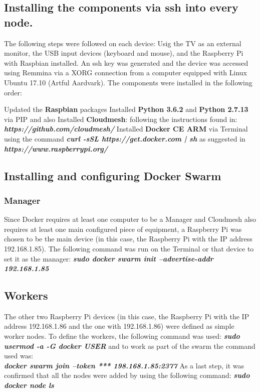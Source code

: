 \documentclass[sigconf]{acmart}
\begin{document}
	\subsection{Installing the components via ssh into every node.}
	
	The following steps were followed on each device:
	Usig the TV as an external monitor, the USB input devices (keyboard and mouse), and the Raspberry Pi with Raspbian installed. An ssh key was generated and the device was accessed using Remmina via a XORG connection from a computer equipped with Linux Ubuntu 17.10 (Artful Aardvark).
	The components were installed in the following order:
	
	Updated the \textbf{Raspbian} packages \textbf{\textit{}}
	Installed \textbf{Python 3.6.2} and \textbf{Python 2.7.13} via PIP and also 
	Installed \textbf{Cloudmesh}: following the instructions found in: \textbf{\textit{https://github.com/cloudmesh/}}
	Installed \textbf{Docker CE ARM} via Terminal using the command \textbf{\textit{curl -sSL https://get.docker.com | sh}}
	as suggested in\\ \textbf{\textit{https://www.raspberrypi.org/}}

	
	\subsection{Installing and configuring Docker Swarm}
	\subsubsection{Manager}
	Since Docker requires at least one computer to be a Manager and Cloudmesh also requires at least one main configured piece of equipment, a Raspberry Pi was chosen to be the main device (in this case, the Raspberry Pi with the IP address 192.168.1.85). The following command was run on the Terminal or that device to set it as the manager: \textbf{\textit{sudo docker swarm init --advertise-addr 192.168.1.85}}
	\subsection{Workers}
	The other two Raspberry Pi devices (in this case, the Raspberry Pi with the IP address 192.168.1.86 and the one with 192.168.1.86) were defined as simple worker nodes.
	To define the workers, the following command was used: \textbf{\textit{sudo usermod -a -G docker USER}} and to work as part of the swarm the command used was:\\
	 \textbf{\textit{docker swarm join --token *** 198.168.1.85:2377}}
	As a last step, it was confirmed that all the nodes were added by using the following command: 	 \textbf{\textit{sudo docker node ls}}
	
\end{document}
